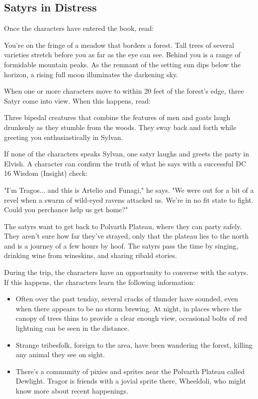 \documentclass[10pt,a4paper,twoside,bg=print,twocolumn,openany,nodeprecatedcode]{dndbook}
\begin{document}
\subsection{Satyrs in Distress}
Once the characters have entered the book, read:

\begin{DndReadAloud}{}
You're on the fringe of a meadow that borders a forest. Tall trees of several varieties stretch before you as far as the eye can see. Behind you is a range of formidable mountain peaks. As the remnant of the setting sun dips below the horizon, a rising full moon illuminates the darkening sky.

\end{DndReadAloud}

When one or more characters move to within 20 feet of the forest's edge, three Satyr come into view. When this happens, read:

\begin{DndReadAloud}{}
Three bipedal creatures that combine the features of men and goats laugh drunkenly as they stumble from the woods. They sway back and forth while greeting you enthusiastically in Sylvan.

\end{DndReadAloud}

If none of the characters speaks Sylvan, one satyr laughs and greets the party in Elvish. A character can confirm the truth of what he says with a successful DC 16 Wisdom (Insight) check:

\begin{DndReadAloud}{}
"I'm Tragos... and this is Artelio and Funagi," he says. "We were out for a bit of a revel when a swarm of wild-eyed ravens attacked us. We're in no fit state to fight. Could you perchance help us get home?"

\end{DndReadAloud}

The satyrs want to get back to Polvarth Plateau, where they can party safely. They aren't sure how far they've strayed, only that the plateau lies to the north and is a journey of a few hours by hoof. The satyrs pass the time by singing, drinking wine from wineskins, and sharing ribald stories.

During the trip, the characters have an opportunity to converse with the satyrs. If this happens, the characters learn the following information:


\begin{itemize}
\item Often over the past tenday, several cracks of thunder have sounded, even when there appears to be no storm brewing. At night, in places where the canopy of trees thins to provide a clear enough view, occasional bolts of red lightning can be seen in the distance.
\item Strange tribesfolk, foreign to the area, have been wandering the forest, killing any animal they see on sight.
\item There's a community of pixies and sprites near the Polvarth Plateau called Dewlight. Tragor is friends with a jovial sprite there, Wheeldoli, who might know more about recent happenings.
\end{itemize}
\end{document}
